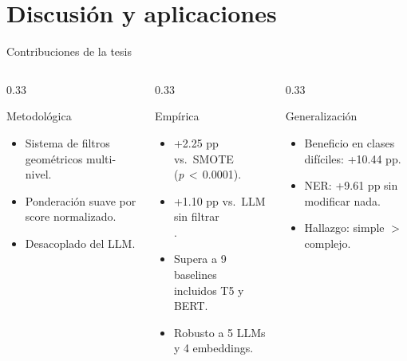 
\section{Discusión y aplicaciones}

\begin{frame}{Contribuciones de la tesis}
\small
\begin{columns}[T]

\begin{column}{0.33\textwidth}
\begin{block}{Metodológica}
\scriptsize
\begin{itemize}\setlength\itemsep{0pt}
  \item Sistema de filtros geométricos multi-nivel.
  \item Ponderación suave por score normalizado.
  \item Desacoplado del LLM.
\end{itemize}
\end{block}
\end{column}

\begin{column}{0.33\textwidth}
\begin{block}{Empírica}
\scriptsize
\begin{itemize}\setlength\itemsep{0pt}
  \item +2.25 pp vs.\ SMOTE\\(\textit{p}\,$<$\,0.0001).
  \item +1.10 pp vs.\ LLM sin filtrar\\.
  \item Supera a 9 baselines\\incluidos T5 y BERT.
  \item Robusto a 5 LLMs y 4 embeddings.
\end{itemize}
\end{block}
\end{column}

\begin{column}{0.33\textwidth}
\begin{block}{Generalización}
\scriptsize
\begin{itemize}\setlength\itemsep{0pt}
  \item Beneficio en clases difíciles: +10.44 pp.
  \item NER: +9.61 pp sin modificar nada.
  \item Hallazgo: simple $>$ complejo.
\end{itemize}
\end{block}
\end{column}


\end{columns}
\end{frame}
